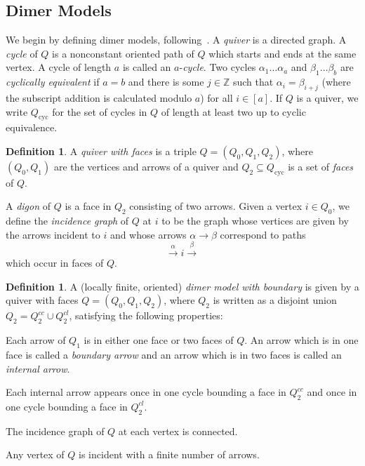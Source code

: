 \documentclass{article}
\theoremstyle{definition}
\newtheorem{defn}[thm]{Definition}
\begin{document}
\subsection{Dimer Models}

We begin by defining dimer models, following~\cite[\S3]{BKMX}.
A \textit{quiver} is a directed graph. A \textit{cycle} of $Q$ is a nonconstant oriented path of $Q$ which starts and ends at the same vertex.  A cycle of length $a$ is called an $a$-\emph{cycle}.
Two cycles $\alpha_1\dots\alpha_a$ and $\beta_1\dots\beta_b$ are \emph{cyclically equivalent} if $a=b$ and there is some $j\in\mathbb Z$ such that $\alpha_i=\beta_{i+j}$ (where the subscript addition is calculated modulo $a$) for all $i\in[a]$.
If $Q$ is a quiver, we write $Q_{\text{cyc}}$ for the set of cycles in $Q$ of length at least two up to cyclic equivalence.

\begin{defn}
	A \textit{quiver with faces} is a triple $Q=(Q_0,Q_1,Q_2)$, where $(Q_0,Q_1)$ are the vertices and arrows of a quiver and $Q_2\subseteq Q_{\text{cyc}}$ is a set of \textit{faces} of $Q$.
\end{defn}

A \textit{digon} of $Q$ is a face in $Q_2$ consisting of two arrows.
Given a vertex $i\in Q_0$, we define the \textit{incidence graph} of $Q$ at $i$ to be the graph whose vertices are given by the arrows incident to $i$ and whose arrows $\alpha\to\beta$ correspond to paths
\[\xrightarrow{\alpha}i\xrightarrow{\beta}\]
which occur in faces of $Q$.

\begin{defn}\label{defn:dimer-model}
	A (locally finite, oriented) \textit{dimer model with boundary} is given by a quiver with faces $Q=(Q_0,Q_1,Q_2)$, where $Q_2$ is written as a disjoint union $Q_2=Q_2^{cc}\cup Q_2^{cl}$, satisfying the following properties:
    \begin{enumerate}
        \item Each arrow of $Q_1$ is in either one face or two faces of $Q$. An arrow which is in one face is called a \textit{boundary arrow} and an arrow which is in two faces is called an \textit{internal arrow}.
	\item Each internal arrow appears once in one cycle bounding a face in $Q_2^{cc}$ and once in one cycle bounding a face in $Q_2^{cl}$.
	{\item\label{ddm:4} The incidence graph of $Q$ at each vertex is connected.}
	\item Any vertex of $Q$ is incident with a finite number of arrows.
    \end{enumerate}
\end{defn}
\end{document}
